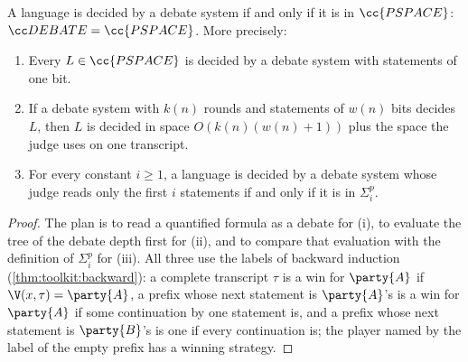 \begin{refsection}
\begin{theorem}\label{thm:debate:pspace}
A language is decided by a debate system if and only if it is in $\cc{PSPACE}$: $\debateclass=\cc{PSPACE}$. More precisely:
\begin{enumerate}
\item \textup{\parencite{IrvingEtAl2018}} Every $L\in\cc{PSPACE}$ is decided by a debate system with statements of one bit.
\item \textup{\parencite{ChandraKozenStockmeyer1981}} If a debate system with $k(n)$ rounds and statements of $w(n)$ bits decides $L$, then $L$ is decided in space $O(k(n)(w(n)+1))$ plus the space the judge uses on one transcript.
\item For every constant $i\ge1$, a language is decided by a debate system whose judge reads only the first $i$ statements if and only if it is in $\Sigma_i^p$.
\end{enumerate}
\end{theorem}

\begin{proof}
The plan is to read a quantified formula as a debate for (i), to evaluate the tree of the debate depth first for (ii), and to compare that evaluation with the definition of $\Sigma_i^p$ for (iii). All three use the labels of backward induction (\cref{thm:toolkit:backward}): a complete transcript $\tau$ is a win for $\party{A}$ if $\V(x,\tau)=\party{A}$, a prefix whose next statement is $\party{A}$'s is a win for $\party{A}$ if some continuation by one statement is, and a prefix whose next statement is $\party{B}$'s is one if every continuation is; the player named by the label of the empty prefix has a winning strategy.


\end{proof}
\end{refsection}
